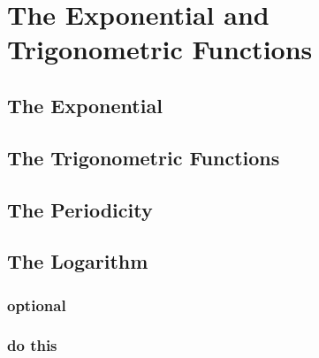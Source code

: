 \section{The Exponential and Trigonometric Functions}
\subsection{The Exponential}

\subsection{The Trigonometric Functions}
\subsubsection{}
\subsubsection{}
\subsubsection{}
\subsubsection{}

\subsection{The Periodicity}

\subsection{The Logarithm}
\subsubsection{}
\subsubsection{optional}
\subsubsection{}
\subsubsection{}
\subsubsection{}
\subsubsection{}
\subsubsection{}
\subsubsection{do this}
\subsubsection{}
\subsubsection{}

